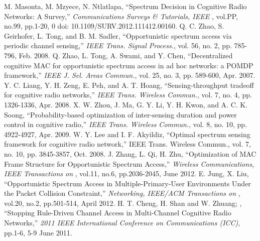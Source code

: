 \begin{thebibliography}{1}
 M. Masonta, M. Mzyece, N. Ntlatlapa, ``Spectrum Decision in Cognitive Radio Networks: A Survey,'' \emph{Communications Surveys \& Tutorials, IEEE }, vol.PP, no.99, pp.1-20, 0 doi: 10.1109/SURV.2012.111412.00160.
 Q. C. Zhao, S. Geirhofer, L. Tong, and B. M. Sadler, ``Opportunistic spectrum access via periodic channel sensing,'' \emph{IEEE Trans. Signal Process.}, vol. 56, no. 2, pp. 785-796, Feb. 2008.
 Q. Zhao, L. Tong, A. Swami, and Y. Chen, ``Decentralized cognitive MAC for opportunistic spectrum access in ad hoc networks: a POMDP framework,'' \emph{IEEE J. Sel. Areas Commun.}, vol. 25, no. 3, pp. 589-600, Apr. 2007.
 Y. C. Liang, Y. H. Zeng, E. Peh, and A. T. Hoang, ``Sensing-throughput tradeoff for cognitive radio networks,'' \emph{IEEE Trans. Wireless Commun.}, vol. 7, no. 4, pp. 1326-1336, Apr. 2008.
 X. W. Zhou, J. Ma, G. Y. Li, Y. H. Kwon, and A. C. K. Soong, ``Probability-based optimization of inter-sensing duration and power control in cognitive radio,'' \emph{IEEE Trans. Wireless Commun.}, vol. 8, no.
10, pp. 4922-4927, Apr. 2009.
 W. Y. Lee and I. F. Akyildiz, ``Optimal spectrum sensing framework for cognitive radio network,'' IEEE Trans. Wireless Commun., vol. 7, no. 10, pp. 3845-3857, Oct. 2008.
 J. Zhang, L. Qi, H. Zhu, ``Optimization of MAC Frame Structure for Opportunistic Spectrum Access,'' \emph{Wireless Communications, IEEE Transactions on }, vol.11, no.6, pp.2036-2045, June 2012.
 E. Jung, X. Liu, ``Opportunistic Spectrum Access in Multiple-Primary-User Environments Under the Packet Collision Constraint,'' \emph{Networking, IEEE/ACM Transactions on }, vol.20, no.2, pp.501-514, April 2012.
 H. T. Cheng, H. Shan and W. Zhuang; , ``Stopping Rule-Driven Channel Access in Multi-Channel Cognitive Radio Networks,'' \emph{2011 IEEE International Conference on Communications (ICC)}, pp.1-6, 5-9 June 2011.

\end{thebibliography}
